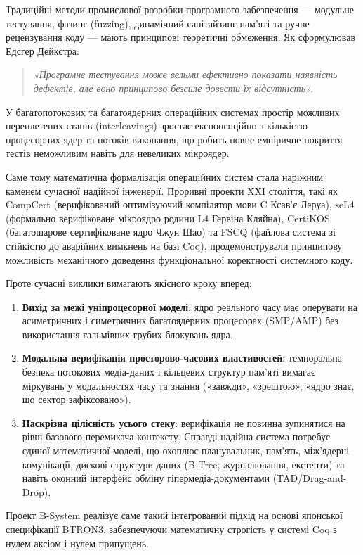 \documentclass{article}
\begin{document}
Традиційні методи промислової розробки програмного забезпечення --- модульне тестування, фазинг (fuzzing), динамічний санітайзинг пам'яті та ручне рецензування коду --- мають принципові теоретичні обмеження. Як сформулював Едсгер Дейкстра:
\begin{quote}
\textit{«Програмне тестування може вельми ефективно показати наявність дефектів, але воно принципово безсиле довести їх відсутність».}
\end{quote}
У багатопотокових та багатоядерних операційних системах простір можливих переплетених станів (interleavings) зростає експоненційно з кількістю процесорних ядер та потоків виконання, що робить повне емпіричне покриття тестів неможливим навіть для невеликих мікроядер.

Саме тому математична формалізація операційних систем стала наріжним каменем сучасної надійної інженерії. Проривні проекти XXI століття, такі як CompCert (верифікований оптимізуючий компілятор мови C Ксав'є Леруа), seL4 (формально верифіковане мікроядро родини L4 Гервіна Кляйна), CertiKOS (багатошарове сертифіковане ядро Чжун Шао) та FSCQ (файлова система зі стійкістю до аварійних вимкнень на базі Coq), продемонстрували принципову можливість механічного доведення функціональної коректності системного коду.

Проте сучасні виклики вимагають якісного кроку вперед:
\begin{enumerate}
  \item \textbf{Вихід за межі уніпроцесорної моделі}: ядро реального часу має оперувати на асиметричних і симетричних багатоядерних процесорах (SMP/AMP) без використання гальмівних грубих блокувань ядра.
  \item \textbf{Модальна верифікація просторово-часових властивостей}: темпоральна безпека потокових медіа-даних і кільцевих структур пам'яті вимагає міркувань у модальностях часу та знання («завжди», «зрештою», «ядро знає, що сектор зафіксовано»).
  \item \textbf{Наскрізна цілісність усього стеку}: верифікація не повинна зупинятися на рівні базового перемикача контексту. Справді надійна система потребує єдиної математичної моделі, що охоплює планувальник, пам'ять, між'ядерні комунікації, дискові структури даних (B-Tree, журналювання, екстенти) та навіть оконний інтерфейс обміну гіпермедіа-документами (TAD/Drag-and-Drop).
\end{enumerate}

Проект B-System реалізує саме такий інтегрований підхід на основі японської специфікації BTRON3, забезпечуючи математичну строгість у системі Coq з нулем аксіом і нулем припущень.
\end{document}
